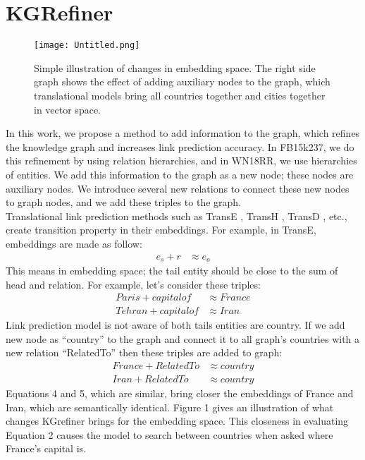 \documentclass{article} \usepackage{iclr2022_conference,times}
\begin{document}
\section{KGRefiner}
\label{headings}
\begin{figure*}[ht!]
	\centering
			\texttt{[image: Untitled.png]}
		\label{fig:verticalcell}
		\caption{Simple illustration of changes in embedding space. The right side graph shows the effect of adding auxiliary nodes to the graph, which translational models bring all countries together and cities together in vector space.}
\end{figure*}
In this work, we propose a method to add information to the graph, which refines the knowledge graph and increases link prediction accuracy. In FB15k237,  we do this refinement by using relation hierarchies, and in WN18RR, we use hierarchies of entities. We add this information to the graph as a new node; these nodes are auxiliary nodes. We introduce several new relations to connect these new nodes to graph nodes, and we add these triples to the graph.\\ 
Translational link prediction methods such as TransE \citep{bordes2013translating}, TransH \citep{transh}, TransD \citep{ji2015knowledge}, etc., create transition property in their embeddings. For example, in TransE, embeddings are made as follow: 
\begin{align}
	e_s + r &\approx e_o
 \end{align}
 This means in embedding space; the tail entity should be close to the sum of head and relation. For example, let's consider these triples: 
 \begin{align}
	Paris + capital of &\approx France \\
Tehran + capital of &\approx Iran
 \end{align}
Link prediction model is not aware of both tails entities are country. If we add new node as ``country'' to the graph and connect it to all graph's countries with a new relation ``RelatedTo'' then these triples are added to graph: 
\begin{align}
France + RelatedTo &\approx country \\
Iran + RelatedTo &\approx country 
\end{align}
Equations 4 and 5, which are similar, bring closer the embeddings of France and Iran, which are semantically identical. Figure 1 gives an illustration of what changes KGrefiner brings for the embedding space. This closeness in evaluating Equation 2 causes the model to search between countries when asked where France’s capital is.
\end{document}
